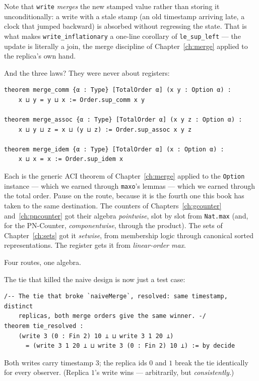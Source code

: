 \documentclass[12pt, a4paper, openright]{book}
\theoremstyle{thmstyle}
\theoremstyle{defstyle}
\newcommand{\lc}[1]{\texttt{#1}}
\begin{document}
Note that \lc{write} \emph{merges} the new stamped value rather than
storing it unconditionally: a write with a stale stamp (an old timestamp
arriving late, a clock that jumped backward) is absorbed without
regressing the state. That is what makes \lc{write_inflationary} a
one-line corollary of \lc{le_sup_left} --- the update is literally a
join, the merge discipline of Chapter~\ref{ch:merge} applied to the
replica's own hand.

And the three laws? They were never about registers:

\begin{verbatim}
theorem merge_comm {α : Type} [TotalOrder α] (x y : Option α) :
    x ⊔ y = y ⊔ x := Order.sup_comm x y

theorem merge_assoc {α : Type} [TotalOrder α] (x y z : Option α) :
    x ⊔ y ⊔ z = x ⊔ (y ⊔ z) := Order.sup_assoc x y z

theorem merge_idem {α : Type} [TotalOrder α] (x : Option α) :
    x ⊔ x = x := Order.sup_idem x
\end{verbatim}

Each is the generic ACI theorem of Chapter~\ref{ch:merge} applied to the
\lc{Option} instance --- which we earned through \lc{maxo}'s lemmas ---
which we earned through the total order. Pause on the route, because it
is the fourth one this book has taken to the same destination. The
counters of Chapters~\ref{ch:gcounter} and~\ref{ch:pncounter} got their
algebra \emph{pointwise}, slot by slot from \lc{Nat.max} (and, for the
PN-Counter, \emph{componentwise}, through the product). The sets of
Chapter~\ref{ch:sets} got it \emph{setwise}, from membership logic
through canonical sorted representations. The register gets it from
\emph{linear-order max}.

Four routes, one algebra.

The tie that killed the naive design is now just a test case:

\begin{verbatim}
/-- The tie that broke `naiveMerge`, resolved: same timestamp, distinct
    replicas, both merge orders give the same winner. -/
theorem tie_resolved :
    (write 3 (0 : Fin 2) 10 ⊥ ⊔ write 3 1 20 ⊥)
      = (write 3 1 20 ⊥ ⊔ write 3 (0 : Fin 2) 10 ⊥) := by decide
\end{verbatim}

Both writes carry timestamp $3$; the replica ids $0$ and $1$ break the
tie identically for every observer. (Replica $1$'s write wins ---
arbitrarily, but \emph{consistently}.)
\end{document}

